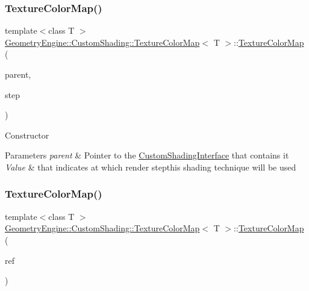 \subsubsection{\texorpdfstring{TextureColorMap()}{TextureColorMap()}\hspace{0.1cm}{\footnotesize\ttfamily [1/2]}}
{\footnotesize\ttfamily template$<$class T $>$ \\
\mbox{\hyperlink{class_geometry_engine_1_1_custom_shading_1_1_texture_color_map}{Geometry\+Engine\+::\+Custom\+Shading\+::\+Texture\+Color\+Map}}$<$ T $>$\+::\mbox{\hyperlink{class_geometry_engine_1_1_custom_shading_1_1_texture_color_map}{Texture\+Color\+Map}} (\begin{DoxyParamCaption}\item[{\mbox{\hyperlink{class_geometry_engine_1_1_custom_shading_1_1_custom_shading_interface}{Custom\+Shading\+Interface}} $\ast$}]{parent,  }\item[{\mbox{\hyperlink{namespace_geometry_engine_1_1_custom_shading_a2dc236a5b567da5099069ce2b2be5609}{Custom\+Shading\+Steps}}}]{step }\end{DoxyParamCaption})\hspace{0.3cm}{\ttfamily [inline]}}

Constructor 
\begin{DoxyParams}{Parameters}
{\em parent} & Pointer to the \mbox{\hyperlink{class_geometry_engine_1_1_custom_shading_1_1_custom_shading_interface}{Custom\+Shading\+Interface}} that contains it \\
\hline
{\em Value} & that indicates at which render stepthis shading technique will be used \\
\hline
\end{DoxyParams}
\mbox{\label{class_geometry_engine_1_1_custom_shading_1_1_texture_color_map_a78b2a1cecd9e82a5b3e80a29509685de}} 
\subsubsection{\texorpdfstring{TextureColorMap()}{TextureColorMap()}\hspace{0.1cm}{\footnotesize\ttfamily [2/2]}}
{\footnotesize\ttfamily template$<$class T $>$ \\
\mbox{\hyperlink{class_geometry_engine_1_1_custom_shading_1_1_texture_color_map}{Geometry\+Engine\+::\+Custom\+Shading\+::\+Texture\+Color\+Map}}$<$ T $>$\+::\mbox{\hyperlink{class_geometry_engine_1_1_custom_shading_1_1_texture_color_map}{Texture\+Color\+Map}} (\begin{DoxyParamCaption}\item[{const \mbox{\hyperlink{class_geometry_engine_1_1_custom_shading_1_1_custom_shading_step}{Custom\+Shading\+Step}} \&}]{ref }\end{DoxyParamCaption})\hspace{0.3cm}{\ttfamily [inline]}}

